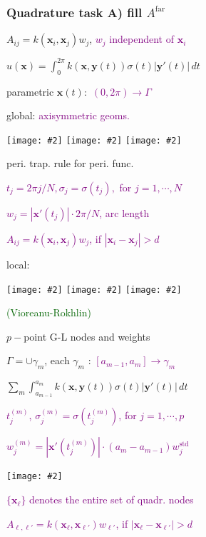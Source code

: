 \documentclass[t]{beamer}
\newcommand{\ft}[1]{\frametitle{#1}}
\newcommand{\mbf}[1]{{\bm #1}}           %
\newcommand{\ig}[2]{\texttt{[image: \#2]}}
\newcommand{\who}[1]{{\scriptsize \textcolor{darkgreen}{(#1)}}}  %
\newcommand{\com}[1]{{\scriptsize \textcolor{purple}{#1}}}      %
\newcommand{\sg}{\vspace{1ex}}
\newcommand{\bmp}[1]{\begin{minipage}{#1}}
\newcommand{\emp}{\end{minipage}}
\newcommand{\xx}{\mbf{x}}
\newcommand{\yy}{\mbf{y}}
\begin{document}
\begin{frame}\ft{Quadrature task A) fill $A^{\text{far}}$}
$A_{ij} = k(\xx_i,\xx_j) w_j$, \com{$w_j$ independent of $\xx_i$} 

\sg 

$u(\xx) = \int_0^{2\pi} k(\xx,\yy(t))\sigma(t) |\yy'(t)|\, dt $

\sg 

parametric $\xx(t):$  \com{$(0,2\pi)\rightarrow \Gamma$}

global: \com{axisymmetric geoms.} 

\bmp{2.5in}
    \ig{width=0.8in}{taskA1}
    \ig{width=0.8in}{taskA2}
    \ig{width=0.8in}{taskA3}
\emp
\hfill
\bmp{2.2in}
\vspace{-35ex}

\hspace{-2ex} peri. trap. rule for peri. func.

\sg

\com{$t_j = 2\pi j/N, \sigma_j=\sigma(t_j),$ for $ j=1,\cdots,N $}

\sg

\com{$w_j = |\xx'(t_j)|\cdot 2\pi/N$, arc length}

\sg
\com{$A_{ij} = k(\xx_i,\xx_j)w_j$, if $|\xx_i-\xx_j|>d$}

\emp

\sg

\pause

local: 

\bmp{2.5in}
    \ig{width=0.8in}{taskA4}
    \ig{width=0.8in}{taskA5}
    \ig{width=0.8in}{taskA6}
    
    \hspace{22ex} \who{Vioreanu-Rokhlin} 
\emp

\hfill
\bmp{2.2in}
\vspace{-32ex}

$p-$point G-L nodes and weights

\sg

$\Gamma=\cup \gamma_m$, each $\gamma_m$ :   \com{$[a_{m-1},a_m]\rightarrow \gamma_m$}

\sg 

$\sum_m \int_{a_{m-1}}^{a_m} k(\xx,\yy(t))\sigma(t) |\yy'(t)|\, dt $

\sg 

\com{$t_j^{(m)}$, $\sigma_j^{(m)}=\sigma(t_j^{(m)})$, for $j=1,\cdots,p $}

\sg

\com{$w_j^{(m)} = |\xx'(t_j^{(m)})|\cdot (a_m-a_{m-1})w_j^{\text{std}}$}

\sg

\quad \ig{width=2in}{panels}

\sg
\com{$\{\xx_{\ell}\}$ denotes the entire set of quadr. nodes} 

\sg
\com{$A_{\ell,\ell'} = k(\xx_{\ell},\xx_{\ell'})w_{\ell'}$, if $|\xx_{\ell}-\xx_{\ell'}|>d$}

\emp

\end{frame}
\end{document}
